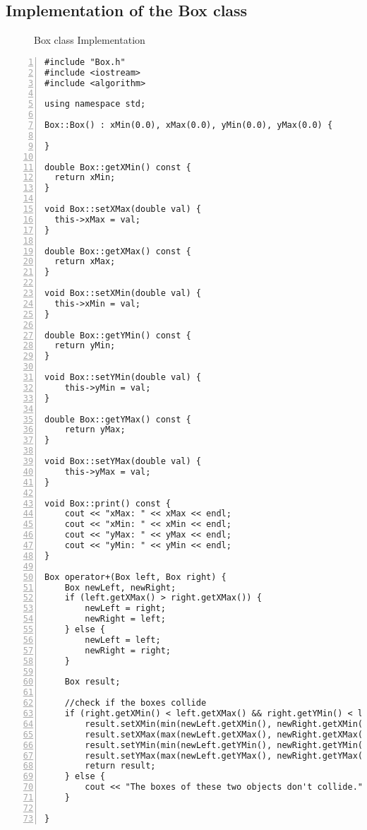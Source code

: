 \documentclass{article}
\begin{document}
\subsection{Implementation of the Box class}
\begin{figure}
  \scriptsize{\caption{Box class Implementation}}
\end{figure}
\begin{lstlisting}[basicstyle=\footnotesize\ttfamily, numbers=left, stepnumber=1, numberstyle = \normalsize]
#include "Box.h"
#include <iostream>
#include <algorithm>

using namespace std;

Box::Box() : xMin(0.0), xMax(0.0), yMin(0.0), yMax(0.0) {

}

double Box::getXMin() const {
  return xMin;
}

void Box::setXMax(double val) {
  this->xMax = val;
}

double Box::getXMax() const {
  return xMax;
}

void Box::setXMin(double val) {
  this->xMin = val;
}

double Box::getYMin() const {
  return yMin;
}

void Box::setYMin(double val) {
	this->yMin = val;
}

double Box::getYMax() const {
	return yMax;
}

void Box::setYMax(double val) {
	this->yMax = val;
}

void Box::print() const {
	cout << "xMax: " << xMax << endl;
	cout << "xMin: " << xMin << endl;
	cout << "yMax: " << yMax << endl;
	cout << "yMin: " << yMin << endl;
}

Box operator+(Box left, Box right) {
	Box newLeft, newRight;
	if (left.getXMax() > right.getXMax()) {
		newLeft = right;
		newRight = left;
	} else {
		newLeft = left;
		newRight = right;
	}

	Box result;

	//check if the boxes collide
	if (right.getXMin() < left.getXMax() && right.getYMin() < left.getYMax()) {
		result.setXMin(min(newLeft.getXMin(), newRight.getXMin()));
		result.setXMax(max(newLeft.getXMax(), newRight.getXMax()));
		result.setYMin(min(newLeft.getYMin(), newRight.getYMin()));
		result.setYMax(max(newLeft.getYMax(), newRight.getYMax()));
		return result;
	} else {
		cout << "The boxes of these two objects don't collide." << '\n';
	}

}
\end{lstlisting}
\end{document}
